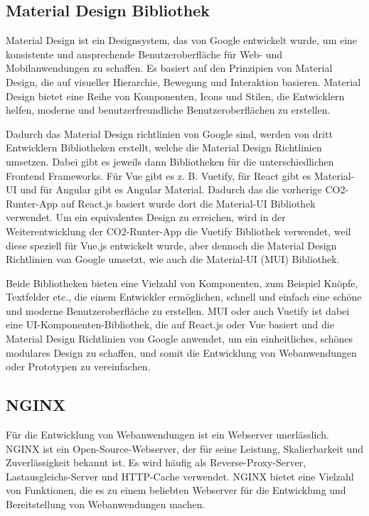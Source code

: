 \subsection{Material Design Bibliothek}

Material Design ist ein Designsystem, das von Google entwickelt wurde, um eine konsistente und ansprechende Benutzeroberfläche für Web- und Mobilanwendungen zu schaffen. Es basiert auf den Prinzipien von Material Design, die auf visueller Hierarchie, Bewegung und Interaktion basieren. Material Design bietet eine Reihe von Komponenten, Icons und Stilen, die Entwicklern helfen, moderne und benutzerfreundliche Benutzeroberflächen zu erstellen. \cite{materialdesign}

Dadurch das Material Design richtlinien von Google sind, werden von dritt Entwicklern Bibliotheken erstellt, welche die Material Design Richtlinien umsetzen. Dabei gibt es jeweils dann Bibliotheken für die unterschiedlichen Frontend Frameworks. Für Vue gibt es z. B. Vuetify, für React gibt es Material-UI und für Angular gibt es Angular Material. Dadurch das die vorherige CO2-Runter-App auf React.js basiert wurde dort die Material-UI Bibliothek verwendet. Um ein equivalentes Design zu erreichen, wird in der Weiterentwicklung der CO2-Runter-App die Vuetify Bibliothek verwendet, weil diese speziell für Vue.js entwickelt wurde, aber dennoch die Material Design Richtlinien von Google umsetzt, wie auch die Material-UI (MUI) Bibliothek.

Beide Bibliotheken bieten eine Vielzahl von Komponenten, zum Beispiel Knöpfe, Textfelder etc., die einem Entwickler ermöglichen, schnell und einfach eine schöne und moderne Benutzeroberfläche zu erstellen. \acf{MUI} oder auch Vuetify ist dabei eine \acs{UI}-Komponenten-Bibliothek, die auf React.js oder Vue basiert und die Material Design Richtlinien von Google anwendet, um ein einheitliches, schönes modulares Design zu schaffen, und somit die Entwicklung von Webanwendungen oder Prototypen zu vereinfachen.\cite{materialui, vuetify}

\subsection{NGINX}


Für die Entwicklung von Webanwendungen ist ein Webserver unerlässlich. \acf{NGINX} ist ein Open-Source-Webserver, der für seine Leistung, Skalierbarkeit und Zuverlässigkeit bekannt ist. Es wird häufig als Reverse-Proxy-Server, Lastausgleichs-Server und HTTP-Cache verwendet. \acs{NGINX} bietet eine Vielzahl von Funktionen, die es zu einem beliebten Webserver für die Entwicklung und Bereitstellung von Webanwendungen machen.

